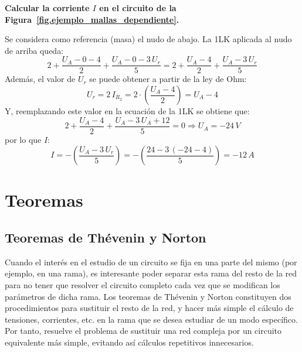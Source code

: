 \documentclass[11pt]{book} %
\begin{document}
	\begin{example}\label{ex.nudos_mod_fdep}
	    \textbf{Calcular la corriente $I$ en el circuito de la Figura~\ref{fig.ejemplo_mallas_dependiente}.}
	    
	    Se considera como referencia (masa) el nudo de abajo. La 1LK aplicada al nudo de arriba queda: 
	    \begin{equation*}
	        2+\dfrac{U_A-0-4}{2}+\dfrac{U_A-0-3\,U_r}{5}=2+\dfrac{U_A-4}{2}+\dfrac{U_A-3\,U_r}{5}
	    \end{equation*}
	    Además, el valor de $U_r$ se puede obtener a partir de la ley de Ohm:
	    \begin{equation*}
	        U_r=2\, I_{R_2}=2\cdot \left( \dfrac{U_A-4}{2} \right)=U_A-4
	    \end{equation*}
	    Y, reemplazando este valor en la ecuación de la 1LK se obtiene que: 
	    \begin{equation*}
	        2+\dfrac{U_A-4}{2}+\dfrac{U_A-3\,U_A+12}{5}=0\Rightarrow U_A=-24\,V
	    \end{equation*}
	    por lo que $I$:
	    \begin{equation*}
	        I=-\left(\dfrac{U_A-3\,U_r}{5} \right)=-\left(\dfrac{24-3\,(-24-4)}{5}\right)=-12\,A
	    \end{equation*}
	\end{example}
	
	\section{Teoremas}\label{sec.teoremas_CC}
	
	\subsection{Teoremas de Thévenin y Norton}
Cuando el interés en el estudio de un circuito se fija en una parte del mismo (por ejemplo, en una rama), es interesante poder separar esta rama del resto de la red para no tener que resolver el circuito completo cada vez que se modifican los parámetros de dicha rama.  Los teoremas de Thévenin y Norton constituyen dos procedimientos para sustituir el resto de la red, y hacer más simple el cálculo de tensiones, corrientes, etc. en la rama que se desea estudiar de un modo específico. Por tanto, resuelve el problema de sustituir una red compleja por un circuito equivalente más simple, evitando así cálculos repetitivos innecesarios. 
\end{document}
